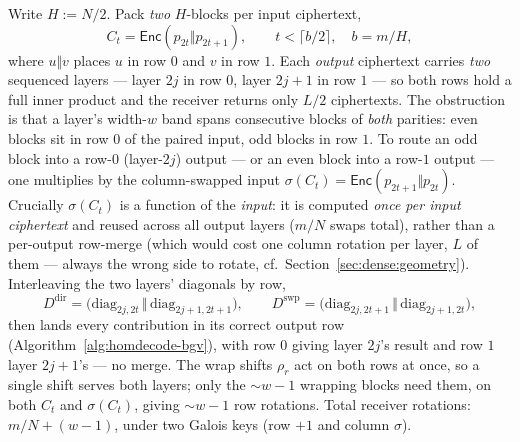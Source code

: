 \documentclass[runningheads]{llncs}
\newcommand{\Enc}{\mathsf{Enc}}
\newcommand{\rr}{\rho}                       %
\newcommand{\colswap}{\sigma}                %
\newcommand{\band}{w}                        %
\newcommand{\half}{H}                        %
\begin{document}
Write $\half:=N/2$. Pack \emph{two} $\half$-blocks per input ciphertext,
\[
  C_t=\Enc(p_{2t}\Vert p_{2t+1}),\qquad t<\lceil b/2\rceil,\quad b=m/\half,
\]
where $u\Vert v$ places $u$ in row $0$ and $v$ in row $1$. Each \emph{output}
ciphertext carries \emph{two} sequenced layers --- layer $2j$ in row $0$, layer
$2j{+}1$ in row $1$ --- so both rows hold a full inner product and the receiver returns
only $L/2$ ciphertexts. The obstruction is that a layer's width-$\band$ band spans
consecutive blocks of \emph{both} parities: even blocks sit in row $0$ of the paired
input, odd blocks in row $1$. To route an odd block into a row-$0$ (layer-$2j$) output
--- or an even block into a row-$1$ output --- one multiplies by the column-swapped
input $\colswap(C_t)=\Enc(p_{2t+1}\Vert p_{2t})$. Crucially $\colswap(C_t)$ is a
function of the \emph{input}: it is computed \emph{once per input ciphertext} and
reused across all output layers ($m/N$ swaps total), rather than a per-output
row-merge (which would cost one column rotation per layer, $L$ of them --- always the
wrong side to rotate, cf.\ Section~\ref{sec:dense:geometry}). Interleaving the two
layers' diagonals by row,
\[
  D^{\mathrm{dir}}=\big(\mathrm{diag}_{2j,2t}\,\Vert\,\mathrm{diag}_{2j+1,2t+1}\big),
  \qquad
  D^{\mathrm{swp}}=\big(\mathrm{diag}_{2j,2t+1}\,\Vert\,\mathrm{diag}_{2j+1,2t}\big),
\]
then lands every contribution in its correct output row
(Algorithm~\ref{alg:homdecode-bgv}), with row $0$ giving layer $2j$'s result and row
$1$ layer $2j{+}1$'s --- no merge. The wrap shifts $\rr_r$ act on both rows at once,
so a single shift serves both layers; only the $\sim\band{-}1$ wrapping blocks need
them, on both $C_t$ and $\colswap(C_t)$, giving $\sim\band{-}1$ row rotations. Total
receiver rotations: $m/N+(\band{-}1)$, under two Galois keys (row $+1$ and column
$\colswap$).
\end{document}
